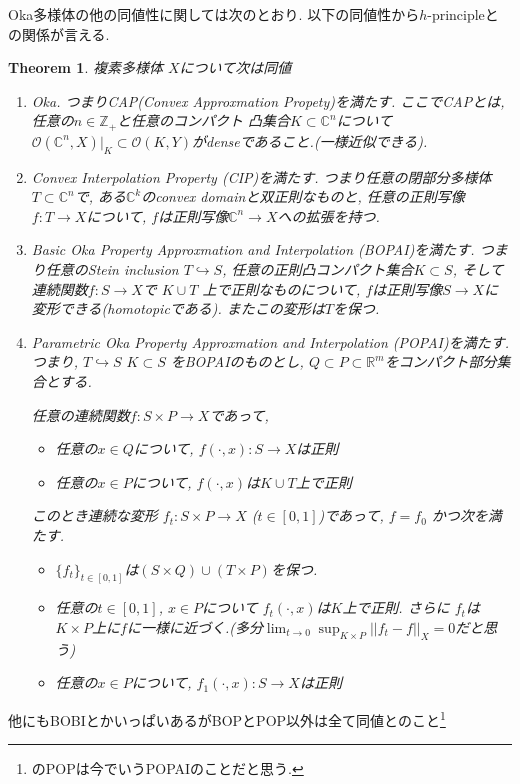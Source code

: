 \documentclass[dvipdfmx,a4paper,11pt]{article} %
\newtheorem{thm}{Theorem}[section]
\theoremstyle{definition}
\theoremstyle{remark}
\numberwithin{equation}{section}
\newcommand{\N}{\mathbb{Z}_+}
\newcommand{\C}{\mathbb{C}}
\begin{document}
Oka多様体の他の同値性に関しては次のとおり. 以下の同値性から$h$-principleとの関係が言える. 
\begin{thm}\cite{FL11}
複素多様体 $X$について次は同値
\begin{enumerate}
  \setlength{\parskip}{0cm} %
  \setlength{\itemsep}{0cm} %
  \item Oka. つまりCAP(Convex Approxmation Propety)を満たす. ここでCAPとは, 任意の$n \in \N$と任意のコンパクト 凸集合$K \subset \C^n$について$\mathcal{O}(\C^n, X)|_{K} \subset \mathcal{O}(K,Y)$がdenseであること.(一様近似できる).
\item Convex Interpolation Property (CIP)を満たす.  
つまり任意の閉部分多様体\(T \subset \mathbb{C}^n\)で, ある$\mathbb{C}^k$のconvex domainと双正則なものと, 任意の正則写像\(f : T \to X\)について, $f$は正則写像\(\mathbb{C}^n \to X\)への拡張を持つ.
  \item Basic Oka Property Approxmation and Interpolation (BOPAI)を満たす. 
  つまり任意のStein inclusion \(T \hookrightarrow S\), 任意の正則凸コンパクト集合\(K \subset S\), そして連続関数\(f : S \to X\)で \(K \cup T\) 上で正則なものについて, $f$は正則写像\(S \to X\)に変形できる(homotopicである). またこの変形は$T$を保つ. 
 \item Parametric Oka Property Approxmation and Interpolation (POPAI)を満たす. 
 つまり,  \(T \hookrightarrow S\) \(K \subset S\) をBOPAIのものとし, 
 \(Q \subset P\subset\mathbb{R}^m\)をコンパクト部分集合とする. 

 任意の連続関数\(f : S \times P \to X\)であって, 
\begin{itemize}
\item 任意の$x \in Q$について, \(f(\cdot,x) : S \to X\)は正則
\item 任意の$x \in P$について, \(f(\cdot,x)\)は\(K \cup T\)上で正則
\end{itemize}
このとき連続な変形
\(f_t : S \times P \to X\) ($t \in [0,1]$)であって, 
\(f=f_0\) かつ次を満たす. 
\begin{itemize}
\item $\{ f_t \}_{t \in [0,1]}$は\((S \times Q) \cup (T \times P)\)を保つ. 
\item 任意の\(t \in [0,1]\), $x \in P$について
\(f_t(\cdot,x)\)は$K$上で正則. さらに \(f_t\)は\(K \times P\)上に$f$に一様に近づく.(多分$\lim_{t \to 0}\sup_{K \times P}||f_t - f||_{X} =0$だと思う)
\item 任意の\(x \in P\)について, \(f_1(\cdot,x) : S \to X\)は正則 
\end{itemize}
\end{enumerate}
\end{thm}
他にもBOBIとかいっぱいあるがBOPとPOP以外は全て同値とのこと\footnote{\cite{FL11}のPOPは今でいうPOPAIのことだと思う. }
\end{document}

